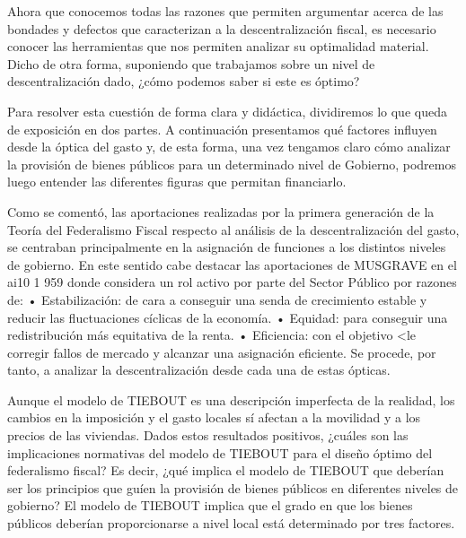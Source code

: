 \documentclass[10pt,a4paper]{article}
\begin{document}
Ahora que conocemos todas las razones que permiten argumentar acerca de las bondades y defectos que caracterizan a la descentralización fiscal, es necesario conocer las herramientas que nos permiten analizar su optimalidad material. Dicho de otra forma, suponiendo que trabajamos sobre un nivel de descentralización dado, ¿cómo podemos saber si este es óptimo?

Para resolver esta cuestión de forma clara y didáctica, dividiremos lo que queda de exposición en dos partes. A continuación presentamos qué factores influyen desde la óptica del gasto y, de esta forma, una vez tengamos claro cómo analizar la provisión de bienes públicos para un determinado nivel de Gobierno, podremos luego entender las diferentes figuras que permitan financiarlo.

Como se comentó, las aportaciones realizadas por la primera generación de la Teoría del Federalismo Fiscal respecto al análisis de la descentralización del gasto, se centraban principalmente en la asignación de funciones a los distintos niveles de gobierno. En este sentido cabe destacar las aportaciones de MUSGRAVE en el ai10 1 959 donde considera un rol activo por parte del Sector Público por razones de:
• Estabilización: de cara a conseguir una senda de crecimiento estable y reducir las fluctuaciones cíclicas de la economía.
• Equidad: para conseguir una redistribución más equitativa de la renta.
• Eficiencia: con el objetivo <le corregir fallos de mercado y alcanzar una asignación eficiente. Se procede, por tanto, a analizar la descentralización desde cada una de estas ópticas.

Aunque el modelo de TIEBOUT es una descripción imperfecta de la realidad, los cambios en la imposición y el gasto locales sí afectan a la movilidad y a los precios de las viviendas. Dados estos resultados positivos, ¿cuáles son las implicaciones normativas del modelo de TIEBOUT para el diseño óptimo del federalismo fiscal? Es decir, ¿qué implica el modelo de TIEBOUT que deberían ser los principios que guíen la provisión de bienes públicos en diferentes niveles de gobierno? El modelo de TIEBOUT implica que el grado en que los bienes públicos deberían proporcionarse a nivel local está determinado por tres factores. 
\end{document}
